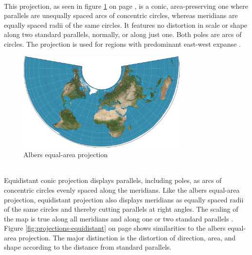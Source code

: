 \begin{enumerate}
 \hfill \\
\label{s:albers-equal-area-projection}
This projection, as seen in figure \ref{fig:projections-albers-ea} on page \pageref{fig:projections-albers-ea}, is a conic, area-preserving one where parallels are unequally spaced arcs of concentric circles, whereas meridians are equally spaced radii of the same circles. It features no distortion in scale or shape along two standard parallels, normally, or along just one. Both poles are arcs of circles. The projection is used for regions with predominant east-west expanse .

\begin{figure}[!htb]
\centering
\includegraphics[height=5cm,keepaspectratio]{images/methods/projections/albers.jpg}
\caption[
    Albers equal-area projection, Urldate: 07.2016 \newline
    \small\texttt{\url{https://upload.wikimedia.org/wikipedia/commons/1/1f/Albers_projection_SW.jpg}}.
]{Albers equal-area projection}
\label{fig:projections-albers-ea}
\end{figure}

 \hfill \\
Equidistant conic projection displays parallels, including poles, as arcs of concentric circles evenly spaced along the meridians. Like the albers equal-area projection, equidistant projection also displays meridians as equally spaced radii of the same circles and thereby cutting parallels at right angles. The scaling of the map is true along all meridians and along one or two standard parallels . Figure \ref{fig:projections-equidistant} on page \pageref{fig:projections-equidistant} shows similarities to the albers equal-area projection. The major distinction is the distortion of direction, area, and shape according to the distance from standard parallels.


\end{enumerate}

